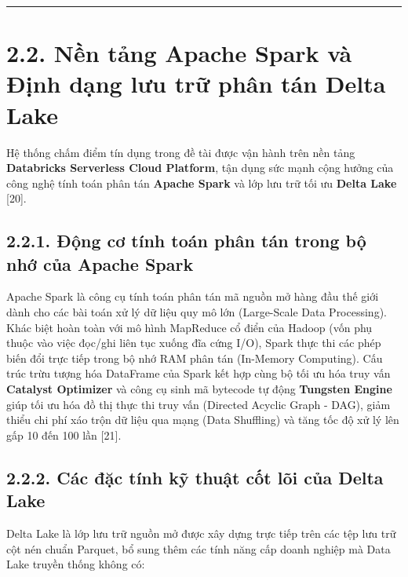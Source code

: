 \documentclass[
  13pt,
  a4paper,
]{report}
\begin{document}
\begin{center}\rule{0.5\linewidth}{0.5pt}\end{center}

\section{2.2. Nền tảng Apache Spark và Định dạng lưu trữ phân tán Delta
Lake}\label{nux1ec1n-tux1ea3ng-apache-spark-vuxe0-ux111ux1ecbnh-dux1ea1ng-lux1b0u-trux1eef-phuxe2n-tuxe1n-delta-lake}

Hệ thống chấm điểm tín dụng trong đề tài được vận hành trên nền tảng
\textbf{Databricks Serverless Cloud Platform}, tận dụng sức mạnh cộng
hưởng của công nghệ tính toán phân tán \textbf{Apache Spark} và lớp lưu
trữ tối ưu \textbf{Delta Lake} {[}20{]}.

\subsection{2.2.1. Động cơ tính toán phân tán trong bộ nhớ của Apache
Spark}\label{ux111ux1ed9ng-cux1a1-tuxednh-touxe1n-phuxe2n-tuxe1n-trong-bux1ed9-nhux1edb-cux1ee7a-apache-spark}

Apache Spark là công cụ tính toán phân tán mã nguồn mở hàng đầu thế giới
dành cho các bài toán xử lý dữ liệu quy mô lớn (Large-Scale Data
Processing). Khác biệt hoàn toàn với mô hình MapReduce cổ điển của
Hadoop (vốn phụ thuộc vào việc đọc/ghi liên tục xuống đĩa cứng I/O),
Spark thực thi các phép biến đổi trực tiếp trong bộ nhớ RAM phân tán
(In-Memory Computing). Cấu trúc trừu tượng hóa DataFrame của Spark kết
hợp cùng bộ tối ưu hóa truy vấn \textbf{Catalyst Optimizer} và công cụ
sinh mã bytecode tự động \textbf{Tungsten Engine} giúp tối ưu hóa đồ thị
thực thi truy vấn (Directed Acyclic Graph - DAG), giảm thiểu chi phí xáo
trộn dữ liệu qua mạng (Data Shuffling) và tăng tốc độ xử lý lên gấp 10
đến 100 lần {[}21{]}.

\subsection{2.2.2. Các đặc tính kỹ thuật cốt lõi của Delta
Lake}\label{cuxe1c-ux111ux1eb7c-tuxednh-kux1ef9-thuux1eadt-cux1ed1t-luxf5i-cux1ee7a-delta-lake}

Delta Lake là lớp lưu trữ nguồn mở được xây dựng trực tiếp trên các tệp
lưu trữ cột nén chuẩn Parquet, bổ sung thêm các tính năng cấp doanh
nghiệp mà Data Lake truyền thống không có:
\end{document}
